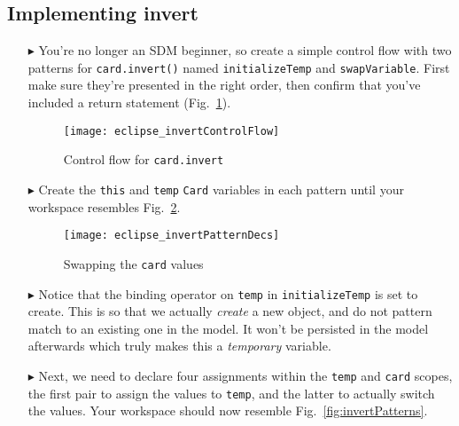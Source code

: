 \newpage
\hypertarget{invertCard tex}{}
\subsection{Implementing invert}
\texHeader

\begin{itemize}

\item[$\blacktriangleright$] You're no longer an SDM beginner, so create a simple control flow with two patterns for \texttt{card.invert()} named
\texttt{initializeTemp} and \texttt{swapVariable}. First make sure they're presented in the right order, then confirm that you've included a return statement
(Fig.~\ref{fig:eclipse_invert}).

\begin{figure}[htbp]
\begin{center}
  \texttt{[image: eclipse\_invertControlFlow]}
  \caption{Control flow for \texttt{card.invert}}  
  \label{fig:eclipse_invert}
\end{center}
\end{figure}

\item[$\blacktriangleright$] Create the \texttt{this} and \texttt{temp} \texttt{Card} variables in each pattern until your workspace resembles
Fig.~\ref{fig:invertPatternsDecs}.

\begin{figure}[htbp]
\begin{center}
  \texttt{[image: eclipse\_invertPatternDecs]}
  \caption{Swapping the \texttt{card} values}  
  \label{fig:invertPatternsDecs}
\end{center}
\end{figure}

\item[$\blacktriangleright$] Notice that the binding operator on \texttt{temp} in \texttt{initializeTemp} is set to create. This is so that we actually
\emph{create} a new object, and do not pattern match to an existing one in the model. It won't be persisted in the model afterwards which truly makes this a
\emph{temporary} variable.

\item[$\blacktriangleright$] Next, we need to declare four assignments within the \texttt{temp} and \texttt{card} scopes, the first pair to assign the values to
\texttt{temp}, and the latter to actually switch the values. Your workspace should now resemble Fig.~\ref{fig:invertPatterns}.


\end{itemize}
